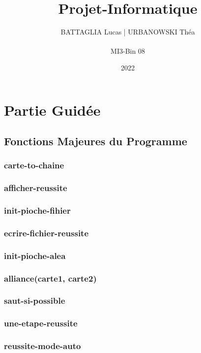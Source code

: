 \documentclass[french, titlepage]{article}
\title{\huge \textbf{Projet-Informatique}}
\author{BATTAGLIA Lucas | URBANOWSKI Théa \\ \\ MI3-Bin 08}
\date{2022}
\begin{document}
\maketitle

\tableofcontents

\newpage


\section{Partie Guidée}

    \subsection{Fonctions Majeures du Programme}
        \subsubsection{\ttfamily carte-to-chaine}
        \subsubsection{\ttfamily afficher-reussite}
        \subsubsection{\ttfamily init-pioche-fihier}
        \subsubsection{\ttfamily ecrire-fichier-reussite}
        \subsubsection{\ttfamily init-pioche-alea}
        \subsubsection{\ttfamily alliance(carte1, carte2)}
        \subsubsection{\ttfamily saut-si-possible}
        \subsubsection{\ttfamily une-etape-reussite}
        \subsubsection{\ttfamily reussite-mode-auto}
\end{document}
